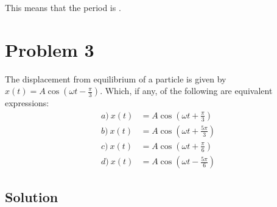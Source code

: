 \documentclass[12pt]{article}
\begin{document}
This means that the period is .
\pagebreak
\section{Problem 3}
The displacement from equilibrium of a particle is given by \(x(t) = A \cos\left(\omega t - \frac{\pi}{3}\right)\). Which, if any, of the following are equivalent expressions:
\begin{align}
    a)\ x(t)    &=  A\cos\left(\omega t + \frac{\pi}{3}\right)\\
    b)\ x(t)    &=  A\cos\left(\omega t + \frac{5\pi}{3}\right)\\
    c)\ x(t)    &=  A\cos\left(\omega t + \frac{\pi}{6}\right)\\
    d)\ x(t)    &=  A\cos\left(\omega t - \frac{5\pi}{6}\right)
\end{align}

\subsection{Solution}
\end{document}

